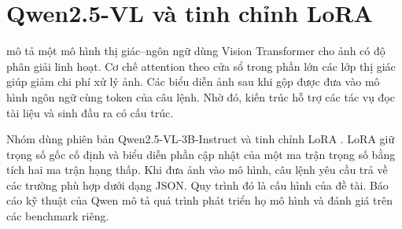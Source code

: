 \section{Qwen2.5-VL và tinh chỉnh LoRA}
\textcite{bai2025} mô tả một mô hình thị giác--ngôn ngữ dùng Vision Transformer cho ảnh có độ phân giải linh hoạt. Cơ chế attention theo cửa sổ trong phần lớn các lớp thị giác giúp giảm chi phí xử lý ảnh. Các biểu diễn ảnh sau khi gộp được đưa vào mô hình ngôn ngữ cùng token của câu lệnh. Nhờ đó, kiến trúc hỗ trợ các tác vụ đọc tài liệu và sinh đầu ra có cấu trúc.

Nhóm dùng phiên bản Qwen2.5-VL-3B-Instruct và tinh chỉnh LoRA \parencite{hu2022}. LoRA giữ trọng số gốc cố định và biểu diễn phần cập nhật của một ma trận trọng số bằng tích hai ma trận hạng thấp. Khi đưa ảnh vào mô hình, câu lệnh yêu cầu trả về các trường phù hợp dưới dạng JSON. Quy trình đó là cấu hình của đề tài. Báo cáo kỹ thuật của Qwen mô tả quá trình phát triển họ mô hình và đánh giá trên các benchmark riêng.

